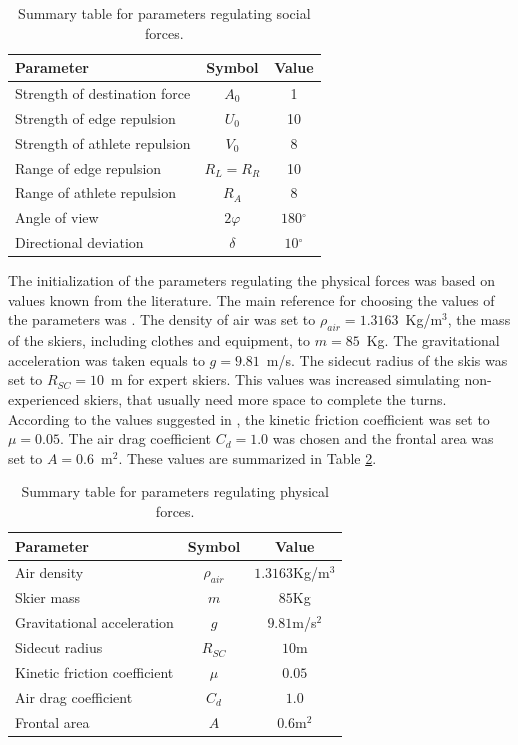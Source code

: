 \documentclass[12pt,a4paper,twoside]{book}
\newcommand{\degree}{\ensuremath{^\circ}}
\begin{document}
\begin{table}[!h]
  \centering
  \begin{tabular}{ | l | c | c | }
    \hline
    Parameter & Symbol & Value \\
    \hline
    Strength of destination force & $A_0$ & 1 \\
    Strength of edge repulsion & $U_0$ & 10 \\
    Strength of athlete repulsion & $V_0$ & 8 \\
    Range of edge repulsion & $R_L=R_R$ & 10 \\
    Range of athlete repulsion & $R_A$ & 8 \\
    Angle of view & $2\varphi$ & $180\degree$ \\
    Directional deviation & $\delta$ & $10\degree$ \\
    \hline
  \end{tabular}
  \caption{Summary table for parameters regulating social forces.}
  \label{social_parameters_table}
\end{table}

The initialization of the parameters regulating the physical forces was based on values known from the literature. The main reference for choosing the values of the parameters was \cite{hol2012}. The density of air was set to $\rho_{air}=1.3163 $~Kg/m$^{3}$, the mass of the skiers, including clothes and equipment, to $m=85 $~Kg. The gravitational acceleration was taken equals to $g=9.81 $~m/s. The sidecut radius of the skis was set to $R_{SC}=10 $~m for expert skiers. This values was increased simulating non-experienced skiers, that usually need more space to complete the turns. According to the values suggested in \cite{bu2004}, the kinetic friction coefficient was set to $\mu = 0.05$. The air drag coefficient $C_d = 1.0$ was chosen and the frontal area was set to $A=0.6 $~m$^2$. These values are summarized in Table \ref{physical_parameters_table}.

\begin{table}[!h]
  \centering
  \begin{tabular}{ | l | c | c |}
    \hline
    Parameter & Symbol & Value \\
    \hline
    Air density & $\rho_{air}$ & $1.3163 $Kg/m$^{3}$ \\
    Skier mass & $m$ & $85 $Kg \\
    Gravitational acceleration & $g$ & $9.81 $m/s$^2$ \\
    Sidecut radius & $R_{SC}$ & $10$m \\
    Kinetic friction coefficient & $\mu$ & $0.05$ \\
    Air drag coefficient & $C_d$ & $1.0$ \\
    Frontal area & $A$ & $0.6 $m$^2$ \\
    \hline
  \end{tabular}
  \caption{Summary table for parameters regulating physical forces.}
  \label{physical_parameters_table}
\end{table}
\end{document}
